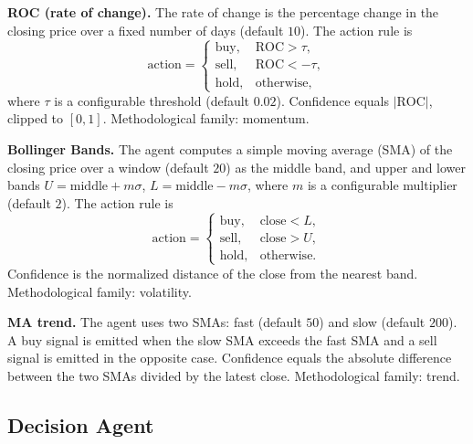\documentclass{ieeeaccess}
\begin{document}
\textbf{ROC (rate of change).} The rate of change is the percentage change in the closing price over a fixed number of days (default $10$). The action rule is
\begin{equation}
\mathrm{action} =
\begin{cases}
\mathrm{buy}, & \mathrm{ROC} > \tau, \\
\mathrm{sell}, & \mathrm{ROC} < -\tau, \\
\mathrm{hold}, & \mathrm{otherwise},
\end{cases}
\end{equation}
where $\tau$ is a configurable threshold (default $0.02$). Confidence equals $|\mathrm{ROC}|$, clipped to $[0, 1]$. Methodological family: momentum.

\textbf{Bollinger Bands.} The agent computes a simple moving average (SMA) of the closing price over a window (default $20$) as the middle band, and upper and lower bands $U = \mathrm{middle} + m\sigma$, $L = \mathrm{middle} - m\sigma$, where $m$ is a configurable multiplier (default $2$). The action rule is
\begin{equation}
\mathrm{action} =
\begin{cases}
\mathrm{buy}, & \mathrm{close} < L, \\
\mathrm{sell}, & \mathrm{close} > U, \\
\mathrm{hold}, & \mathrm{otherwise}.
\end{cases}
\end{equation}
Confidence is the normalized distance of the close from the nearest band. Methodological family: volatility.

\textbf{MA trend.} The agent uses two SMAs: fast (default $50$) and slow (default $200$). A buy signal is emitted when the slow SMA exceeds the fast SMA and a sell signal is emitted in the opposite case. Confidence equals the absolute difference between the two SMAs divided by the latest close. Methodological family: trend.

\subsection{Decision Agent}
\end{document}

